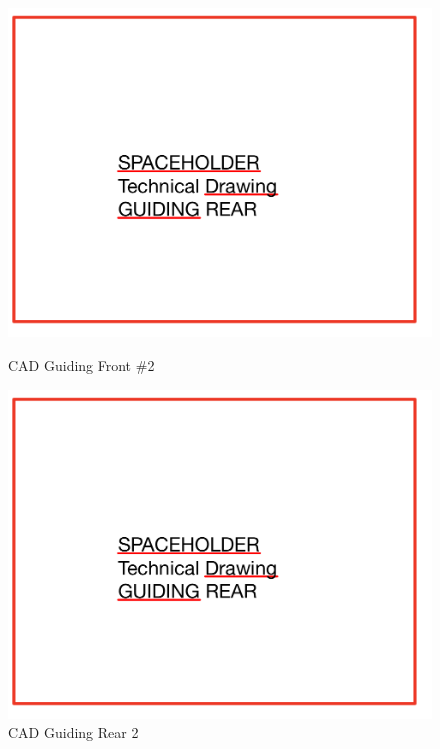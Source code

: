 \begin{figure}[!ht]
  \centering
  \begin{minipage}[b]{0.45\linewidth}
    \includegraphics[width=\linewidth]{guiding_tech_rear.jpg}
    \caption{CAD Guiding Front \#2}
    \label{fig:guiding_front_2}
  \end{minipage}
  \hspace{0.5cm}
  \begin{minipage}[b]{0.45\linewidth}
    \includegraphics[width=\linewidth]{guiding_tech_rear.jpg}
    \caption{CAD Guiding Rear 2}
    \label{fig:guiding_rear_2}
  \end{minipage}
\end{figure}

